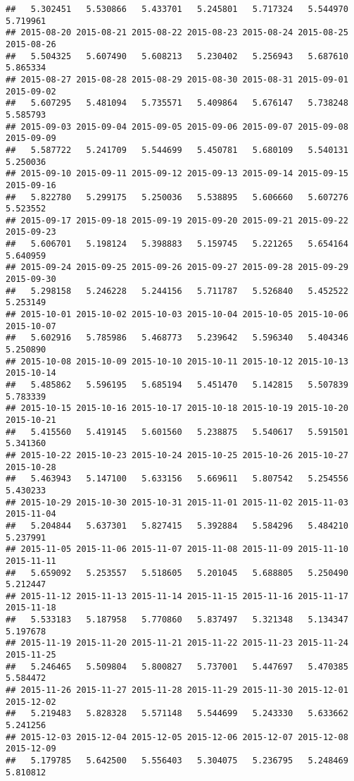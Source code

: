 \documentclass[
]{article}
\begin{document}
\begin{verbatim}
##   5.302451   5.530866   5.433701   5.245801   5.717324   5.544970   5.719961 
## 2015-08-20 2015-08-21 2015-08-22 2015-08-23 2015-08-24 2015-08-25 2015-08-26 
##   5.504325   5.607490   5.608213   5.230402   5.256943   5.687610   5.865334 
## 2015-08-27 2015-08-28 2015-08-29 2015-08-30 2015-08-31 2015-09-01 2015-09-02 
##   5.607295   5.481094   5.735571   5.409864   5.676147   5.738248   5.585793 
## 2015-09-03 2015-09-04 2015-09-05 2015-09-06 2015-09-07 2015-09-08 2015-09-09 
##   5.587722   5.241709   5.544699   5.450781   5.680109   5.540131   5.250036 
## 2015-09-10 2015-09-11 2015-09-12 2015-09-13 2015-09-14 2015-09-15 2015-09-16 
##   5.822780   5.299175   5.250036   5.538895   5.606660   5.607276   5.523552 
## 2015-09-17 2015-09-18 2015-09-19 2015-09-20 2015-09-21 2015-09-22 2015-09-23 
##   5.606701   5.198124   5.398883   5.159745   5.221265   5.654164   5.640959 
## 2015-09-24 2015-09-25 2015-09-26 2015-09-27 2015-09-28 2015-09-29 2015-09-30 
##   5.298158   5.246228   5.244156   5.711787   5.526840   5.452522   5.253149 
## 2015-10-01 2015-10-02 2015-10-03 2015-10-04 2015-10-05 2015-10-06 2015-10-07 
##   5.602916   5.785986   5.468773   5.239642   5.596340   5.404346   5.250890 
## 2015-10-08 2015-10-09 2015-10-10 2015-10-11 2015-10-12 2015-10-13 2015-10-14 
##   5.485862   5.596195   5.685194   5.451470   5.142815   5.507839   5.783339 
## 2015-10-15 2015-10-16 2015-10-17 2015-10-18 2015-10-19 2015-10-20 2015-10-21 
##   5.415560   5.419145   5.601560   5.238875   5.540617   5.591501   5.341360 
## 2015-10-22 2015-10-23 2015-10-24 2015-10-25 2015-10-26 2015-10-27 2015-10-28 
##   5.463943   5.147100   5.633156   5.669611   5.807542   5.254556   5.430233 
## 2015-10-29 2015-10-30 2015-10-31 2015-11-01 2015-11-02 2015-11-03 2015-11-04 
##   5.204844   5.637301   5.827415   5.392884   5.584296   5.484210   5.237991 
## 2015-11-05 2015-11-06 2015-11-07 2015-11-08 2015-11-09 2015-11-10 2015-11-11 
##   5.659092   5.253557   5.518605   5.201045   5.688805   5.250490   5.212447 
## 2015-11-12 2015-11-13 2015-11-14 2015-11-15 2015-11-16 2015-11-17 2015-11-18 
##   5.533183   5.187958   5.770860   5.837497   5.321348   5.134347   5.197678 
## 2015-11-19 2015-11-20 2015-11-21 2015-11-22 2015-11-23 2015-11-24 2015-11-25 
##   5.246465   5.509804   5.800827   5.737001   5.447697   5.470385   5.584472 
## 2015-11-26 2015-11-27 2015-11-28 2015-11-29 2015-11-30 2015-12-01 2015-12-02 
##   5.219483   5.828328   5.571148   5.544699   5.243330   5.633662   5.241256 
## 2015-12-03 2015-12-04 2015-12-05 2015-12-06 2015-12-07 2015-12-08 2015-12-09 
##   5.179785   5.642500   5.556403   5.304075   5.236795   5.248469   5.810812 

\end{verbatim}
\end{document}
